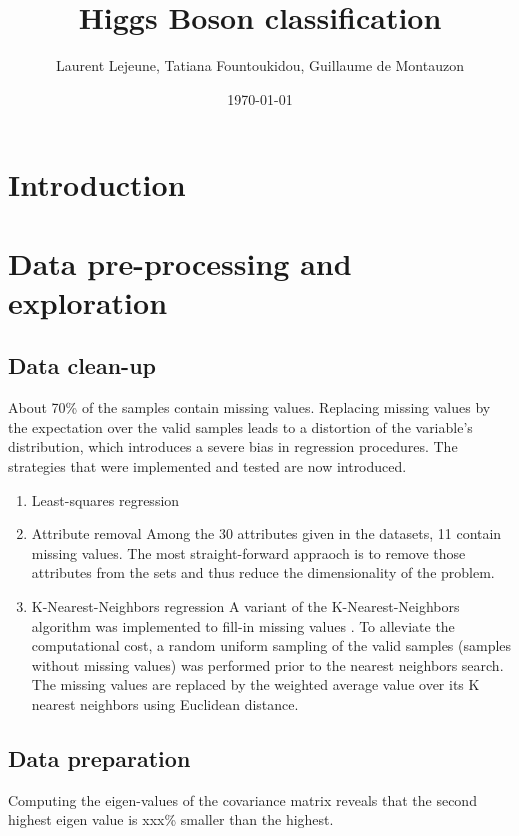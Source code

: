 \documentclass[10pt,conference,compsocconf]{IEEEtran}
\author{Laurent Lejeune, Tatiana Fountoukidou, Guillaume de Montauzon}
\date{\today}
\title{Higgs Boson classification}
\begin{document}
\maketitle
\section{Introduction}
\label{sec:orgheadline1}


\section{Data pre-processing and exploration}
\label{sec:orgheadline8}

\subsection{Data clean-up}
\label{sec:orgheadline5}
About 70\% of the samples contain missing values. Replacing missing values by the expectation over the valid samples leads to a distortion of the variable's distribution, which introduces a severe bias in regression procedures. The strategies that were implemented and tested are now introduced.

\begin{enumerate}
\item Least-squares regression
\label{sec:orgheadline2}

\item Attribute removal
\label{sec:orgheadline3}
Among the 30 attributes given in the datasets, 11 contain missing values. The most straight-forward appraoch is to remove those attributes from the sets and thus reduce the dimensionality of the problem.

\item K-Nearest-Neighbors regression
\label{sec:orgheadline4}
A variant of the K-Nearest-Neighbors algorithm was implemented to fill-in missing values \cite{malarvizhi12}. To alleviate the computational cost, a random uniform sampling of the valid samples (samples without missing values) was performed prior to the nearest neighbors search.
The missing values are replaced by the weighted average value over its K nearest neighbors using Euclidean distance.
\end{enumerate}

\subsection{Data preparation}
\label{sec:orgheadline6}
Computing the eigen-values of the covariance matrix reveals that the second highest eigen value is xxx\% smaller than the highest.
\end{document}
